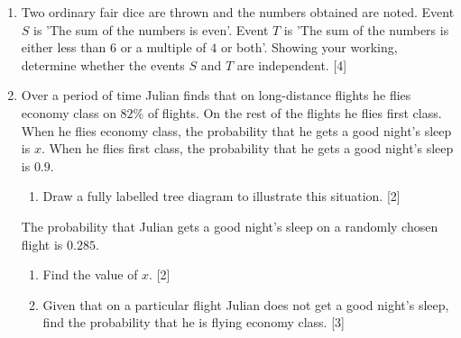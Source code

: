 \begin{enumerate}
	For a randomly chosen member, the probability of being an Advanced swimmer is the same as the
	probability of being a Beginner. 
	
	\begin{enumerate}[label=(\roman*)]
		\item Find $x$ \hfill [3]
		\item Given that a randomly chosen member is an Advanced swimmer, find the probability that the
		member is male. \hfill [3]
	\end{enumerate}
	
	

\item	Two ordinary fair dice are thrown and the numbers obtained are noted. Event $S$ is 'The sum of the numbers is even'. Event $T$ is 'The sum of the numbers is either less than $6$ or a multiple of $4$ or both'. Showing your working, determine whether the events $S$ and $T$ are independent. \hfill  [4]
	
	
	

\item 	Over a period of time Julian finds that on long-distance flights he flies economy class on $82\%$ of flights. On the rest of the flights he flies first class. When he flies economy class, the probability that he gets a good night's sleep is $x$. When he flies first class, the probability that he gets a good night's
sleep is $0.9$.

\begin{enumerate}[label=(\roman*)]
	\item Draw a fully labelled tree diagram to illustrate this situation. \hfill[2]
\end{enumerate}

The probability that Julian gets a good night's sleep on a randomly chosen flight is $0.285$.

\begin{enumerate}[resume,label=(\roman*)]
	\item Find the value of $x$. \hfill [2]
	\item Given that on a particular flight Julian does not get a good night's sleep, find the probability that he is flying economy class. \hfill [3]
\end{enumerate}
	


\end{enumerate}
